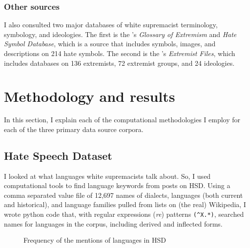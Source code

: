 \documentclass[output=paper,colorlinks,citecolor=brown]{langscibook}
\begin{document}
\subsubsection{Other sources}

I also consulted two major databases of white supremacist terminology, symbology, and ideologies. The first is the \citeauthor{jp:Anti-DefamationLeague2022}'s \citeyear{jp:Anti-DefamationLeague2022} \emph{Glossary of Extremism} and \emph{Hate Symbol Database}, which is a source that includes symbols, images, and descriptions on 214 hate symbols. The second is the \citeauthor{jp:SouthernPovertyLawCenter2022}'s \citeyear{jp:SouthernPovertyLawCenter2022} \emph{Extremist Files}, which includes databases on 136 extremists, 72 extremist groups, and 24 ideologies.

\section{Methodology and results}\label{sec:powell:2}

In this section, I explain each of the computational methodologies I employ for each of the three primary data source corpora.


\subsection{Hate Speech Dataset}

I looked at what languages white supremacists talk about. So, I used computational tools to find language keywords from posts on HSD. Using a comma separated value file of 12,697 names of dialects, languages (both current and historical), and language families pulled from lists on (the real) Wikipedia, I wrote python code that, with regular expressions (\emph{re}) patterns \texttt{(\^{}X.*)}, searched names for languages in the corpus, including derived and inflected forms.

\begin{figure}
    \small
    \PowellTableOne
    \caption{Frequency of the mentions of languages in HSD}
    \label{fig:powell:1}
\end{figure}
\end{document}
